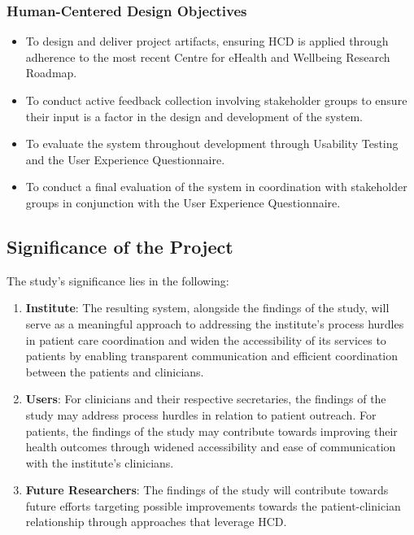 \documentclass[11pt,a4paper,titlepage]{article}
\begin{document}
	\subsubsection{Human-Centered Design Objectives}
	\begin{itemize}
		\item To design and deliver project artifacts, ensuring HCD is applied through adherence to the most recent Centre for eHealth and Wellbeing Research Roadmap. 
		\item To conduct active feedback collection involving stakeholder groups to ensure their input is a factor in the design and development of the system.
		\item To evaluate the system throughout development through Usability Testing and the User Experience Questionnaire. 
		\item To conduct a final evaluation of the system in coordination with stakeholder groups in conjunction with the User Experience Questionnaire.
	\end{itemize}
	\subsection{Significance of the Project}
	 The study's significance lies in the following: 
	\begin{enumerate}
		\item \textbf{Institute}: The resulting system, alongside the findings of the study,  will serve as a meaningful approach to addressing the institute's process hurdles in patient care coordination and widen the accessibility of its services to patients by enabling transparent communication and efficient coordination between the patients and clinicians. 
		\item \textbf{Users}: For clinicians and their respective secretaries, the findings of the study may address  process hurdles in relation to patient outreach. For patients, the findings of the study may contribute towards improving their health outcomes through widened accessibility and ease of communication with the institute's clinicians. 
		\item \textbf{Future Researchers}: The findings of the study will contribute towards future efforts targeting possible improvements towards the patient-clinician relationship through approaches that leverage HCD. 
	\end{enumerate}
\end{document}
